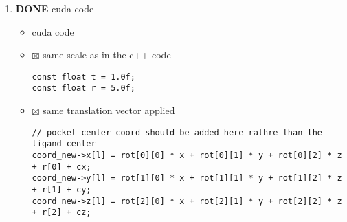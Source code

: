 \documentclass[11pt]{article}
\begin{document}
\begin{enumerate}
\item {\bfseries\sffamily DONE} cuda code
\label{sec-2-2-1-2}
\begin{itemize}
\item cuda code
\item $\boxtimes$ same scale as in the c++ code
\begin{verbatim}
const float t = 1.0f;
const float r = 5.0f;
\end{verbatim}
\item $\boxtimes$ same translation vector applied
\begin{verbatim}
// pocket center coord should be added here rathre than the ligand center
coord_new->x[l] = rot[0][0] * x + rot[0][1] * y + rot[0][2] * z + r[0] + cx;
coord_new->y[l] = rot[1][0] * x + rot[1][1] * y + rot[1][2] * z + r[1] + cy;
coord_new->z[l] = rot[2][0] * x + rot[2][1] * y + rot[2][2] * z + r[2] + cz;
\end{verbatim}


\end{itemize}
\end{enumerate}
\end{document}
